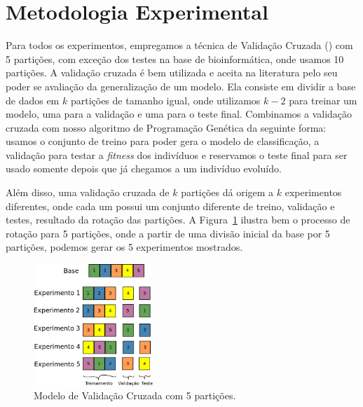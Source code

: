 

\section{Metodologia Experimental}
\label{subsubsec::cv}

Para todos os experimentos, empregamos a técnica de Validação Cruzada (\cite{Refaeilzadeh00}) com 5 partições, com exceção dos testes na base de bioinformática, onde usamos 10 partições.
A validação cruzada é bem utilizada e aceita na literatura pelo seu poder se avaliação da generalização de um modelo. Ela consiste em dividir a base de dados em $k$ partições de tamanho igual, onde utilizamos $k-2$ para treinar um modelo, uma para a validação e uma para o teste final. 
Combinamos a validação cruzada com nosso algoritmo de Programação Genética da seguinte forma: usamos o conjunto de treino para poder gera o modelo de classificação, a validação para testar a \textit{fitness} dos indivíduos e reservamos o teste final para ser usado somente depois que já chegamos a um indivíduo evoluído. 

Além disso, uma validação cruzada de $k$ partições dá origem a $k$ experimentos diferentes, onde cada um possui um conjunto diferente de treino, validação e testes, resultado da rotação das partições. A Figura~\ref{fig::cv} ilustra bem o processo de rotação para 5 partições, onde a partir de uma divisão inicial da base por 5 partições, podemos gerar os 5 experimentos mostrados.

\begin{figure}[h!]
  \centering
  \includegraphics[width=0.40\textwidth]{figures/cv.png}
 \caption{Modelo de Validação Cruzada com 5 partições.}
\label{fig::cv}
\end{figure}

